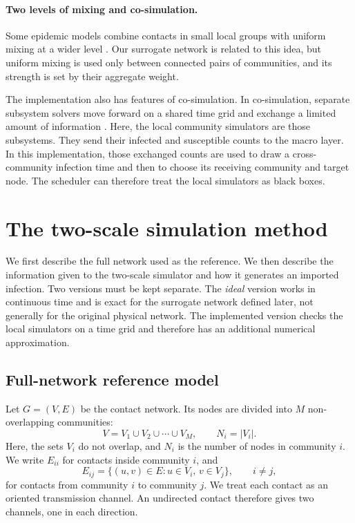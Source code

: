 \documentclass[a4paper,fleqn]{cas-sc}
\begin{document}
\paragraph{Two levels of mixing and co-simulation.}
Some epidemic models combine contacts in small local groups with uniform mixing at a wider level \citep{ball1997}. Our surrogate network is related to this idea, but uniform mixing is used only between connected pairs of communities, and its strength is set by their aggregate weight.

The implementation also has features of co-simulation. In co-simulation, separate subsystem solvers move forward on a shared time grid and exchange a limited amount of information \citep{gomes2018cosim}. Here, the local community simulators are those subsystems. They send their infected and susceptible counts to the macro layer. In this implementation, those exchanged counts are used to draw a cross-community infection time and then to choose its receiving community and target node. The scheduler can therefore treat the local simulators as black boxes.

\clearpage

\section{The two-scale simulation method}
\label{sec:method}

We first describe the full network used as the reference. We then describe the information given to the two-scale simulator and how it generates an imported infection. Two versions must be kept separate. The \emph{ideal} version works in continuous time and is exact for the surrogate network defined later, not generally for the original physical network. The implemented version checks the local simulators on a time grid and therefore has an additional numerical approximation.

\subsection{Full-network reference model}
\label{sec:reference}

Let $G=(V,E)$ be the contact network. Its nodes are divided into $M$ non-overlapping communities:
\begin{equation}
\label{eq:partition}
V=V_1\cup V_2\cup\cdots\cup V_M,
\qquad N_i=|V_i|.
\end{equation}
Here, the sets $V_i$ do not overlap, and $N_i$ is the number of nodes in community $i$. We write $E_{ii}$ for contacts inside community $i$, and
\[
E_{ij}=\{(u,v)\in E:u\in V_i,\,v\in V_j\},
\qquad i\neq j,
\]
for contacts from community $i$ to community $j$. We treat each contact as an oriented transmission channel. An undirected contact therefore gives two channels, one in each direction.
\end{document}
